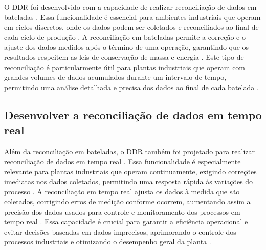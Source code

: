 O DDR foi desenvolvido com a capacidade de realizar reconciliação de dados em bateladas \cite{reconset}. Essa funcionalidade é essencial para ambientes industriais que operam em ciclos discretos, onde os dados podem ser coletados e reconciliados ao final de cada ciclo de produção \cite{danielhoduin}. A reconciliação em bateladas permite a correção e o ajuste dos dados medidos após o término de uma operação, garantindo que os resultados respeitem as leis de conservação de massa e energia \cite{balancecontrol}. Este tipo de reconciliação é particularmente útil para plantas industriais que operam com grandes volumes de dados acumulados durante um intervalo de tempo, permitindo uma análise detalhada e precisa dos dados ao final de cada batelada \cite{datarecshakar}.

\subsection{Desenvolver a reconciliação de dados em tempo real}

Além da reconciliação em bateladas, o DDR também foi projetado para realizar reconciliação de dados em tempo real \cite{datarecshakar}. Essa funcionalidade é especialmente relevante para plantas industriais que operam continuamente, exigindo correções imediatas nos dados coletados, permitindo uma resposta rápida às variações do processo \cite{danielhoduin}. A reconciliação em tempo real ajusta os dados à medida que são coletados, corrigindo erros de medição conforme ocorrem, aumentando assim a precisão dos dados usados para controle e monitoramento dos processos em tempo real \cite{reformulationdatarecon}. Essa capacidade é crucial para garantir a eficiência operacional e evitar decisões baseadas em dados imprecisos, aprimorando o controle dos processos industriais e otimizando o desempenho geral da planta \cite{computecontrol}.
